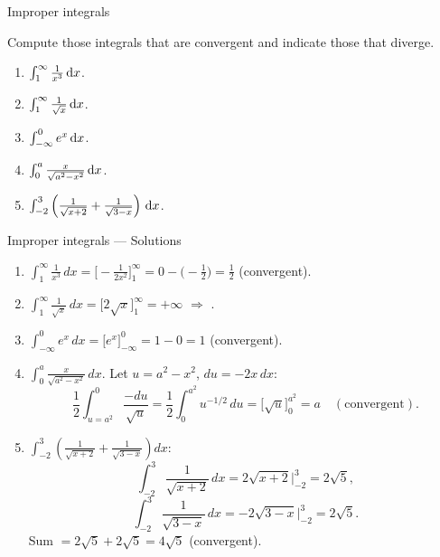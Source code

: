 \documentclass[9pt]{beamer}
\begin{document}
\begin{frame}{Improper integrals}

    Compute those integrals that are convergent and indicate those that diverge.

    \begin{enumerate}[leftmargin = 0.5cm, label = (\alph*), rightmargin = 0.2cm]
        
        \item $\int_1^\infty \frac{1}{x^3}\,\mathrm{d} x$.

        \item $\int_1^\infty \frac{1}{\sqrt{x}}\,\mathrm{d} x$.

        \item $\int_{-\infty}^0 e^x\,\mathrm{d} x$.

        \item $\int_0^a \frac{x}{\sqrt{a^2 - x^2}}\,\mathrm{d} x$.

        \item $\int_{-2}^3 \left(\frac{1}{\sqrt{x + 2}} + \frac{1}{\sqrt{3 - x}}\right)\, \mathrm{d} x$.
   
    \end{enumerate}
    
\end{frame}

\begin{frame}{Improper integrals — Solutions}
    \small
    \begin{enumerate}[leftmargin=0.5cm,label=(\alph*),rightmargin=0.2cm]
      \item $\displaystyle \int_1^\infty \frac{1}{x^3}\,dx
      =\Big[-\frac{1}{2x^2}\Big]_{1}^{\infty}=0-\!\Big(-\frac12\Big)=\boxed{\tfrac12}$ (convergent).
    
      \item $\displaystyle \int_1^\infty \frac{1}{\sqrt{x}}\,dx
      =\Big[2\sqrt{x}\Big]_{1}^{\infty}=+\infty$ \;\;$\Rightarrow$ \;\;.
    
      \item $\displaystyle \int_{-\infty}^{0} e^x\,dx
      =\Big[e^x\Big]_{-\infty}^{0}=1-0=\boxed{1}$ (convergent).
    
      \item $\displaystyle \int_0^a \frac{x}{\sqrt{a^2-x^2}}\,dx$.
      Let $u=a^2-x^2$, $du=-2x\,dx$:
      \[
      \frac12\!\int_{u= a^2}^{0}\!\!\frac{-du}{\sqrt{u}}
      =\frac12\!\int_{0}^{a^2}\!u^{-1/2}\,du
      =\Big[\sqrt{u}\Big]_{0}^{a^2}=\boxed{a}\quad(\text{convergent}).
      \]
    
      \item $\displaystyle \int_{-2}^{3}\!\!\left(\frac{1}{\sqrt{x+2}}+\frac{1}{\sqrt{3-x}}\right)\!dx$:
      \[
      \int_{-2}^{3}\!\frac{1}{\sqrt{x+2}}\,dx=2\sqrt{x+2}\Big|_{-2}^{3}=2\sqrt{5},
      \]
      \[
      \int_{-2}^{3}\!\frac{1}{\sqrt{3-x}}\,dx=-2\sqrt{3-x}\Big|_{-2}^{3}=2\sqrt{5}.
      \]
      Sum $=2\sqrt{5}+2\sqrt{5}=\boxed{4\sqrt{5}}$ (convergent).
    \end{enumerate}
\end{frame}
\end{document}
